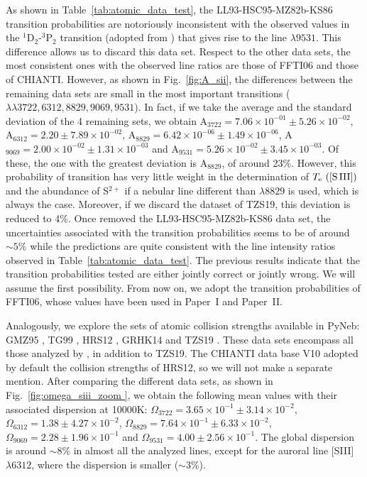 \documentclass[fleqn,usenatbib]{mnras}
\begin{document}
As shown in Table~\ref{tab:atomic_data_test}, the LL93-HSC95-MZ82b-KS86 transition probabilities are notoriously inconsistent with the observed values in the $^1$D$_2$-$^3$P$_2$ transition (adopted from \citet{KS86}) that gives rise to the line $\lambda 9531$. This difference allows us to discard this data set. Respect to the other data sets, the most consistent ones with the observed line ratios are those of FFTI06 and those of CHIANTI. However, as shown in Fig.~\ref{fig:A_sii}, the differences between the remaining data sets are small in the most important transitions ($\lambda \lambda 3722, 6312, 8829, 9069, 9531$). In fact, if we take the average and the standard deviation of the 4 remaining sets, we obtain A$_{3722}=7.06 \times 10^{-01} \pm 5.26 \times 10^{-02}$, A$_{6312}=2.20 \pm 7.89 \times 10^{-02}$, A$_{8829}=6.42 \times 10^{-06} \pm 1.49 \times 10^{-06}$, A$_{9069}=2.00 \times 10^{-02} \pm 1.31 \times 10^{-03}$ and A$_{9531}=5.26 \times 10^{-02} \pm 3.45 \times 10^{-03}$. Of these, the one with the greatest deviation is A$_{8829}$, of around 23\%. However, this probability of transition has very little weight in the determination of $T_{\rm e} \text{ ([S\thinspace III])}$ and the abundance of S$^{2+}$ if a nebular line different than $\lambda 8829$ is used, which is always the case. Moreover, if we discard the dataset of TZS19, this deviation is reduced to 4\%. Once removed the LL93-HSC95-MZ82b-KS86 data set, the uncertainties associated with the transition probabilities seems to be of around $\sim 5$\% while the predictions are quite consistent with the line intensity ratios observed in Table~\ref{tab:atomic_data_test}. The previous results indicate that the transition probabilities tested are either jointly correct or jointly wrong. We will assume the first possibility. From now on, we adopt the transition probabilities of FFTI06, whose values have been used in Paper~I and Paper~II.

Analogously, we explore the sets of atomic collision strengths available in PyNeb: GMZ95 \citep[][]{GMZ95}, TG99 \citep[][]{TG99}, HRS12 \citep[HRS12][]{}, GRHK14 \citep[][]{GRHK14} and TZS19 \citep[][]{TZS19}. These data sets encompass all those analyzed by \citet{Juan-de-Dios17}, in addition to TZS19. The CHIANTI data base V10 adopted by default the collision strengths of HRS12, so we will not make a separate mention. After comparing the different data sets, as shown in Fig.~\ref{fig:omega_siii_zoom }, we obtain the following mean values with their associated dispersion at 10000K: $\Omega_{3722}=3.65\times 10^{-1}\pm3.14\times 10^{-2} $, $\Omega_{6312}=1.38 \pm4.27\times 10^{-2} $, $\Omega_{8829}=7.64 \times 10^{-1}\pm6.33\times 10^{-2} $, $\Omega_{9069}=2.28\pm1.96\times 10^{-1} $ and $\Omega_{9531}=4.00\pm2.56\times 10^{-1} $. The global dispersion is around $\sim 8$\% in almost all the analyzed lines, except for the auroral line [S\thinspace III] $\lambda 6312$, where the dispersion is smaller ($\sim 3$\%).
\end{document}
